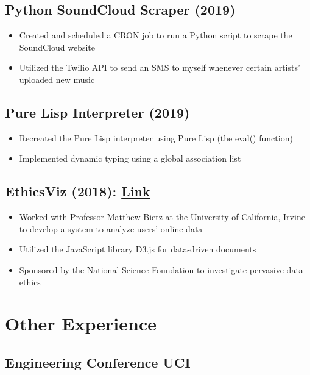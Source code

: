 \documentclass[10pt]{article}
\begin{document}
\subsection{Python SoundCloud Scraper (2019)}

\begin{itemize}
	\setlength\itemsep{0em}
	\item Created and scheduled a CRON job to run a Python script to scrape the SoundCloud website
	\item Utilized the Twilio API to send an SMS to myself whenever certain artists' uploaded new music
\end{itemize}

\subsection{Pure Lisp Interpreter (2019)}

\begin{itemize}
	\setlength\itemsep{0em}
	\item Recreated the Pure Lisp interpreter using Pure Lisp (the eval() function)
	\item Implemented dynamic typing using a global association list
\end{itemize}

\subsection{EthicsViz (2018): \href{https://pervade.umd.edu/}{Link}}

\begin{itemize}
	\setlength\itemsep{0em}
	\item Worked with Professor Matthew Bietz at the University of California, Irvine to develop a system to analyze users' online data
	\item Utilized the JavaScript library D3.js for data-driven documents
	\item Sponsored by the National Science Foundation to investigate pervasive data ethics
\end{itemize}
\section{Other Experience}

\subsection{Engineering Conference UCI}
\end{document}

